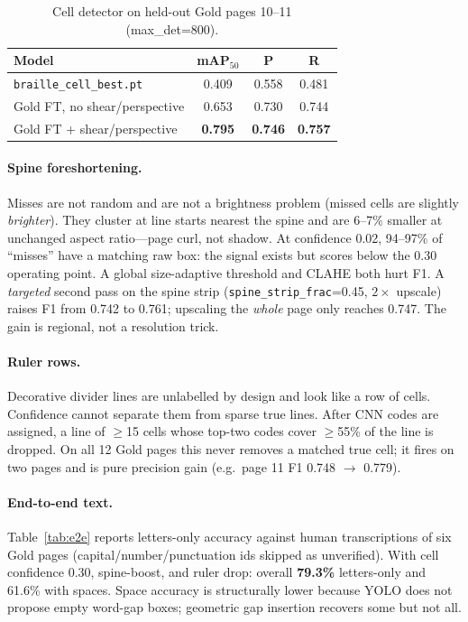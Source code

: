 \documentclass[conference]{IEEEtran}
\begin{document}
\begin{table}[t]
\caption{Cell detector on held-out Gold pages 10--11 (max\_det=800).}
\label{tab:det}
\centering
\begin{tabular}{lccc}
\toprule
Model & mAP$_{50}$ & P & R \\
\midrule
\texttt{braille\_cell\_best.pt} & 0.409 & 0.558 & 0.481 \\
Gold FT, no shear/perspective & 0.653 & 0.730 & 0.744 \\
Gold FT + shear/perspective & \textbf{0.795} & \textbf{0.746} & \textbf{0.757} \\
\bottomrule
\end{tabular}
\end{table}

\paragraph{Spine foreshortening.}
Misses are not random and are not a brightness problem (missed cells are
slightly \textit{brighter}). They cluster at line starts nearest the
spine and are 6--7\% smaller at unchanged aspect ratio---page curl, not
shadow. At confidence 0.02, 94--97\% of ``misses'' have a matching raw
box: the signal exists but scores below the 0.30 operating point. A
global size-adaptive threshold and CLAHE both hurt F1. A
\textit{targeted} second pass on the spine strip
(\texttt{spine\_strip\_frac}=0.45, $2\times$ upscale) raises F1 from
0.742 to 0.761; upscaling the \textit{whole} page only reaches 0.747.
The gain is regional, not a resolution trick.

\paragraph{Ruler rows.}
Decorative divider lines are unlabelled by design and look like a row of
cells. Confidence cannot separate them from sparse true lines. After
CNN codes are assigned, a line of $\ge$15 cells whose top-two codes
cover $\ge$55\% of the line is dropped. On all 12 Gold pages this never
removes a matched true cell; it fires on two pages and is pure precision
gain (e.g.\ page 11 F1 0.748 $\rightarrow$ 0.779).

\paragraph{End-to-end text.}
Table~\ref{tab:e2e} reports letters-only accuracy against human
transcriptions of six Gold pages (capital/number/punctuation ids
skipped as unverified). With cell confidence 0.30, spine-boost, and
ruler drop: overall \textbf{79.3\%} letters-only and 61.6\% with spaces.
Space accuracy is structurally lower because YOLO does not propose empty
word-gap boxes; geometric gap insertion recovers some but not all.
\end{document}
